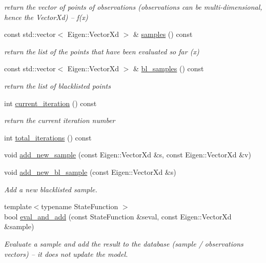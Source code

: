 \begin{DoxyCompactItemize}
\begin{DoxyCompactList}\small\item\em return the vector of points of observations (observations can be multi-\/dimensional, hence the Vector\+Xd) -- f(x) \end{DoxyCompactList}\item 
const std\+::vector$<$ Eigen\+::\+Vector\+Xd $>$ \& \hyperlink{classlimbo_1_1bayes__opt_1_1_bo_base_ad3ba0dba1418df0ed8e79d4dd3cc907a}{samples} () const 
\begin{DoxyCompactList}\small\item\em return the list of the points that have been evaluated so far (x) \end{DoxyCompactList}\item 
const std\+::vector$<$ Eigen\+::\+Vector\+Xd $>$ \& \hyperlink{classlimbo_1_1bayes__opt_1_1_bo_base_aa84e215cffa97a4e287aad3690f89635}{bl\+\_\+samples} () const 
\begin{DoxyCompactList}\small\item\em return the list of blacklisted points \end{DoxyCompactList}\item 
int \hyperlink{classlimbo_1_1bayes__opt_1_1_bo_base_ac3d643d5a668edf22ad053bfc54ea090}{current\+\_\+iteration} () const 
\begin{DoxyCompactList}\small\item\em return the current iteration number \end{DoxyCompactList}\item 
int \hyperlink{classlimbo_1_1bayes__opt_1_1_bo_base_a5470e106c4584a30636cafb6fbad6d73}{total\+\_\+iterations} () const 
\item 
void \hyperlink{classlimbo_1_1bayes__opt_1_1_bo_base_ac533d6397b0c0fa5ba0a4d03e0545fa2}{add\+\_\+new\+\_\+sample} (const Eigen\+::\+Vector\+Xd \&s, const Eigen\+::\+Vector\+Xd \&v)
\item 
void \hyperlink{classlimbo_1_1bayes__opt_1_1_bo_base_a8694d4bbc5c373d067790ec31fb42a44}{add\+\_\+new\+\_\+bl\+\_\+sample} (const Eigen\+::\+Vector\+Xd \&s)
\begin{DoxyCompactList}\small\item\em Add a new blacklisted sample. \end{DoxyCompactList}\item 
{\footnotesize template$<$typename State\+Function $>$ }\\bool \hyperlink{classlimbo_1_1bayes__opt_1_1_bo_base_a387fba7bf70aa9410e1c04f035694f34}{eval\+\_\+and\+\_\+add} (const State\+Function \&seval, const Eigen\+::\+Vector\+Xd \&sample)
\begin{DoxyCompactList}\small\item\em Evaluate a sample and add the result to the \textquotesingle{}database\textquotesingle{} (sample / observations vectors) -- it does not update the model. \end{DoxyCompactList}\end{DoxyCompactItemize}


